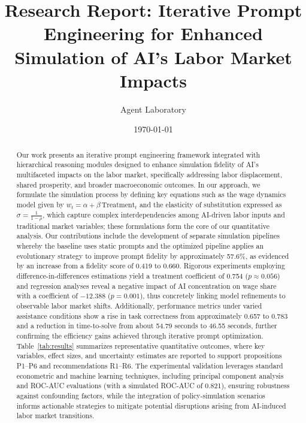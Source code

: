\documentclass{article}
\title{Research Report: Iterative Prompt Engineering for Enhanced Simulation of AI’s Labor Market Impacts}
\author{Agent Laboratory}
\date{\today}
\begin{document}
\maketitle

\begin{abstract}
Our work presents an iterative prompt engineering framework integrated with hierarchical reasoning modules designed to enhance simulation fidelity of AI’s multifaceted impacts on the labor market, specifically addressing labor displacement, shared prosperity, and broader macroeconomic outcomes. In our approach, we formulate the simulation process by defining key equations such as the wage dynamics model given by \( w_t = \alpha + \beta\,\text{Treatment}_t \) and the elasticity of substitution expressed as \( \sigma = \frac{1}{1-\rho} \), which capture complex interdependencies among AI-driven labor inputs and traditional market variables; these formulations form the core of our quantitative analysis. Our contributions include the development of separate simulation pipelines whereby the baseline uses static prompts and the optimized pipeline applies an evolutionary strategy to improve prompt fidelity by approximately 57.6\%, as evidenced by an increase from a fidelity score of 0.419 to 0.660. Rigorous experiments employing difference-in-differences estimations yield a treatment coefficient of 0.754 (\(p\approx0.056\)) and regression analyses reveal a negative impact of AI concentration on wage share with a coefficient of \(-12.388\) (\(p=0.001\)), thus concretely linking model refinements to observable labor market shifts. Additionally, performance metrics under varied assistance conditions show a rise in task correctness from approximately 0.657 to 0.783 and a reduction in time-to-solve from about 54.79 seconds to 46.55 seconds, further confirming the efficiency gains achieved through iterative prompt optimization. Table~\ref{tab:results} summarizes representative quantitative outcomes, where key variables, effect sizes, and uncertainty estimates are reported to support propositions P1–P6 and recommendations R1–R6. The experimental validation leverages standard econometric and machine learning techniques, including principal component analysis and ROC-AUC evaluations (with a simulated ROC-AUC of 0.821), ensuring robustness against confounding factors, while the integration of policy-simulation scenarios informs actionable strategies to mitigate potential disruptions arising from AI-induced labor market transitions.
\end{abstract}
\end{document}
